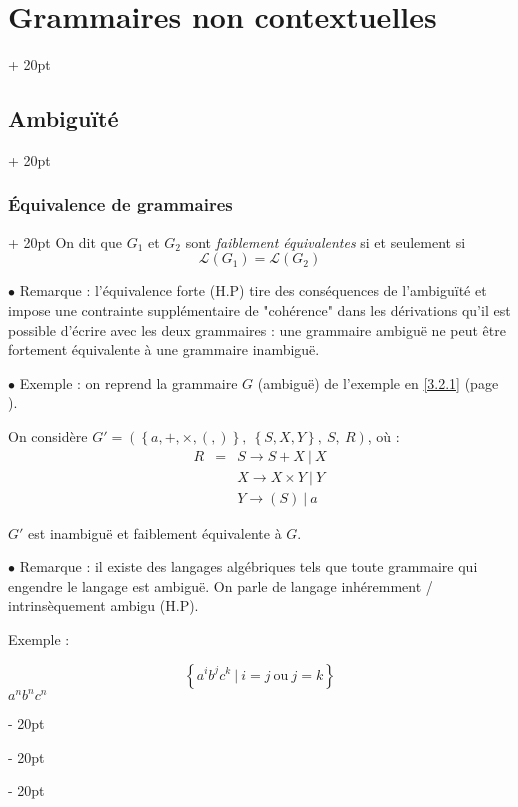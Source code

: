 \documentclass[a4paper, 12pt, twoside]{article}
\newcommand{\lr}[1]{\left( #1 \right)}
\newcommand{\set}[1]{\left\{ #1 \right\}}
\newcommand{\ind}[1][20pt]{\advance\leftskip + #1}
\newcommand{\deind}[1][20pt]{\advance\leftskip - #1}
\newenvironment{indt}[2][20pt]{#2 \par \ind[#1]}{\par \deind} %
\begin{document}
\begin{indt}{\section{Grammaires non contextuelles}}
\begin{indt}{\subsection{Ambiguïté}}
\begin{indt}{\subsubsection{\'Equivalence de grammaires}}
                On dit que $G_1$ et $G_2$ sont \emph{faiblement équivalentes} si et seulement si
                \[
                    \mathcal L(G_1) = \mathcal L(G_2)
                \]

                \vspace{12pt}
                
                $\bullet$ Remarque : l'équivalence forte (H.P) tire des conséquences de l'ambiguïté et impose une contrainte supplémentaire de "cohérence" dans les dérivations qu'il est possible d'écrire avec les deux grammaires : une grammaire ambiguë ne peut être fortement équivalente à une grammaire inambiguë.

                \vspace{12pt}
                
                $\bullet$ Exemple : on reprend la grammaire $G$ (ambiguë) de l'exemple en \ref{3.2.1} (page \pageref{3.2.1}).

                On considère $G' = \lr{\set{a, +, \times, (, )},\ \set{S, X, Y},\ S,\ R}$, où :
                \[
                    \begin{array}{rcl}
                        R
                        &=&
                        S \rightarrow S + X \ |\ X
                        \\
                        && X \rightarrow X \times Y \ |\ Y
                        \\
                        && Y \rightarrow (S) \ |\ a
                    \end{array}
                \]

                $G'$ est inambiguë et faiblement équivalente à $G$.

                \vspace{12pt}
                
                $\bullet$ Remarque : il existe des langages algébriques tels que toute grammaire qui engendre le langage est ambiguë. On parle de langage inhéremment / intrinsèquement ambigu (H.P).

                Exemple :

                \[
                    \set{a^i b^j c^k\ |\ i = j\ \text{ou}\ j = k}
                \]
                $a^nb^nc^n$
            \end{indt}
        \end{indt}

        \vspace{12pt}
        

\end{indt}
\end{document}
